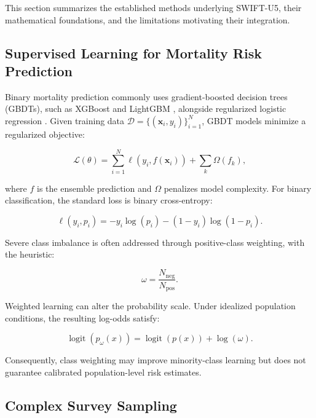 \documentclass[a4paper,fleqn]{cas-sc}
\begin{document}
This section summarizes the established methods underlying SWIFT-U5, their mathematical foundations, and the limitations motivating their integration.

\subsection{Supervised Learning for Mortality Risk Prediction}
\label{sec:conv_ml}

Binary mortality prediction commonly uses gradient-boosted decision trees (GBDTs), such as XGBoost \cite{chen2016} and LightGBM \cite{ke2017}, alongside regularized logistic regression \cite{saroj2022,mabula2025,bitew2020}. Given training data $\mathcal{D}=\{(\mathbf{x}_i,y_i)\}_{i=1}^{N}$, GBDT models minimize a regularized objective:

\begin{equation}
\mathcal{L}(\theta)=
\sum_{i=1}^{N}\ell(y_i,f(\mathbf{x}_i))
+\sum_{k}\Omega(f_k),
\end{equation}

where $f$ is the ensemble prediction and $\Omega$ penalizes model complexity. For binary classification, the standard loss is binary cross-entropy:

\begin{equation}
\ell(y_i,p_i)=
-y_i\log(p_i)-(1-y_i)\log(1-p_i).
\end{equation}

Severe class imbalance is often addressed through positive-class weighting, with the heuristic:

\begin{equation}
\omega=\frac{N_{\mathrm{neg}}}{N_{\mathrm{pos}}}.
\end{equation}

Weighted learning can alter the probability scale. Under idealized population conditions, the resulting log-odds satisfy:

\begin{equation}
\operatorname{logit}(p_{\omega}(x))
=
\operatorname{logit}(p(x))+\log(\omega).
\end{equation}

Consequently, class weighting may improve minority-class learning but does not guarantee calibrated population-level risk estimates.

\subsection{Complex Survey Sampling}
\label{sec:conv_survey}
\end{document}
